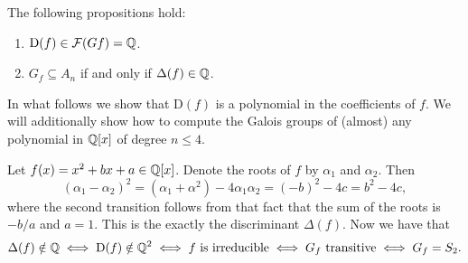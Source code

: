 \documentclass[11pt,a4paper]{article}
\renewcommand{\Dif}{\mathrm{D}}
\begin{document}
\begin{corollary}
  The following propositions hold:
  \begin{enumerate}
    \item[(1)] $\Dif(f) \in \FF(G f) = \Q$.
    \item[(2)] $G_f \subseteq A_n$ if and only if $\Delta(f) \in \mathbb{Q}$.
  \end{enumerate}
\end{corollary}

\begin{remark}
  In what follows we show that $\Dif(f)$ is a polynomial in the coefficients
  of $f$.
  We will additionally show how to compute the Galois groups of (almost)
  any polynomial in $\mathbb{Q}[x]$ of degree $n \le 4$.
\end{remark}

\begin{example}
  Let $f(x) = x^2 + bx + a \in \mathbb{Q}[x]$.
  Denote the roots of $f$ by $\alpha_1$ and $\alpha_2$.
  Then
  \[
    (\alpha_1 - \alpha_2)^2 =
    (\alpha_1 + \alpha^2) - 4 \alpha_1 \alpha_2 =
    (- b)^2 - 4c = b^2 - 4c,
  \]
  where the second transition follows from
  that fact that the sum of the roots is $-b/a$ and $a = 1$.
  This is the exactly the discriminant $\Delta(f)$.
  Now we have that
  \[
    \Delta(f) \notin \Q \iff
    \Dif(f) \notin \Q^2 \iff
    f \text{ is irreducible} \iff
    G_f \text{ transitive} \iff
    G_f = S_2.
  \]
\end{example}
\end{document}
